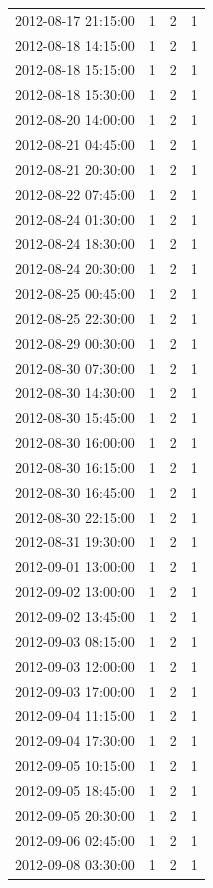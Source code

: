\begin{tabular}{lrrr}
2012-08-17 21:15:00 & 1 & 2 & 1 \\
2012-08-18 14:15:00 & 1 & 2 & 1 \\
2012-08-18 15:15:00 & 1 & 2 & 1 \\
2012-08-18 15:30:00 & 1 & 2 & 1 \\
2012-08-20 14:00:00 & 1 & 2 & 1 \\
2012-08-21 04:45:00 & 1 & 2 & 1 \\
2012-08-21 20:30:00 & 1 & 2 & 1 \\
2012-08-22 07:45:00 & 1 & 2 & 1 \\
2012-08-24 01:30:00 & 1 & 2 & 1 \\
2012-08-24 18:30:00 & 1 & 2 & 1 \\
2012-08-24 20:30:00 & 1 & 2 & 1 \\
2012-08-25 00:45:00 & 1 & 2 & 1 \\
2012-08-25 22:30:00 & 1 & 2 & 1 \\
2012-08-29 00:30:00 & 1 & 2 & 1 \\
2012-08-30 07:30:00 & 1 & 2 & 1 \\
2012-08-30 14:30:00 & 1 & 2 & 1 \\
2012-08-30 15:45:00 & 1 & 2 & 1 \\
2012-08-30 16:00:00 & 1 & 2 & 1 \\
2012-08-30 16:15:00 & 1 & 2 & 1 \\
2012-08-30 16:45:00 & 1 & 2 & 1 \\
2012-08-30 22:15:00 & 1 & 2 & 1 \\
2012-08-31 19:30:00 & 1 & 2 & 1 \\
2012-09-01 13:00:00 & 1 & 2 & 1 \\
2012-09-02 13:00:00 & 1 & 2 & 1 \\
2012-09-02 13:45:00 & 1 & 2 & 1 \\
2012-09-03 08:15:00 & 1 & 2 & 1 \\
2012-09-03 12:00:00 & 1 & 2 & 1 \\
2012-09-03 17:00:00 & 1 & 2 & 1 \\
2012-09-04 11:15:00 & 1 & 2 & 1 \\
2012-09-04 17:30:00 & 1 & 2 & 1 \\
2012-09-05 10:15:00 & 1 & 2 & 1 \\
2012-09-05 18:45:00 & 1 & 2 & 1 \\
2012-09-05 20:30:00 & 1 & 2 & 1 \\
2012-09-06 02:45:00 & 1 & 2 & 1 \\
2012-09-08 03:30:00 & 1 & 2 & 1 \\

\end{tabular}
